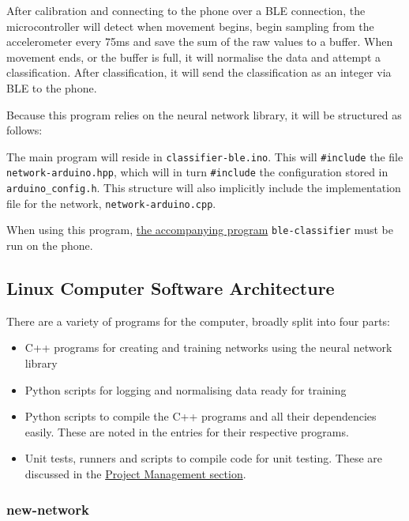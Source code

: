 \documentclass[a4paper]{article}
\begin{document}
After calibration and connecting to the phone over a BLE connection, the microcontroller will detect when movement begins, begin sampling from the accelerometer every 75ms and save the sum of the raw values to a buffer. When movement ends, or the buffer is full, it will normalise the data and attempt a classification. After classification, it will send the classification as an integer via BLE to the phone.

Because this program relies on the neural network library, it will be structured as follows:

The main program will reside in \lstinline{classifier-ble.ino}. This will \lstinline{#include} the file \lstinline{network-arduino.hpp}, which will in turn \lstinline{#include} the configuration stored in \lstinline{arduino_config.h}. 
This structure will also implicitly include the implementation file for the network, \lstinline{network-arduino.cpp}.

When using this program, \hyperref[subsubsec:dc_asa_classifier]{the accompanying program} \lstinline{ble-classifier} must be run on the phone.

\newpage
\subsection{Linux Computer Software Architecture}%
\label{subsec:dc_csa}

There are a variety of programs for the computer, broadly split into four parts:

\begin{itemize}
\item C++ programs for creating and training networks using the neural network library
\item Python scripts for logging and normalising data ready for training
\item Python scripts to compile the C++ programs and all their dependencies easily. These are noted in the entries for their respective programs.
\item Unit tests, runners and scripts to compile code for unit testing. These are discussed in the \hyperref[subsec:pp_testing]{Project Management section}.
\end{itemize}

\subsubsection{new-network}%
\label{subsubsec:dc_csa_newnetwork}
\end{document}
